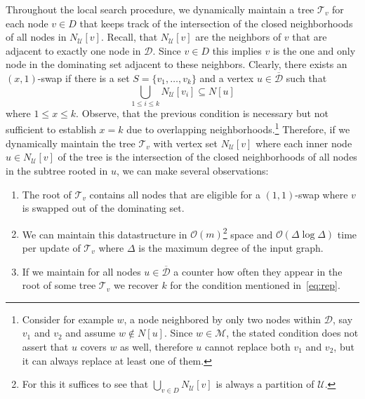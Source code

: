 \documentclass[a4paper, USenglish, cleveref, autoref, thm-restate, noalgorithm2e]{socg-lipics-v2021}
\def\Oh#1{\ensuremath{\mathcal O\!\left(#1\right)}}
\newcommand{\domset}{\ensuremath{\mathcal D}\xspace}
\newcommand{\uniquelycovered}{\ensuremath{\mathcal U}\xspace}
\newcommand{\multicovered}{\ensuremath{\mathcal M}\xspace}
\newcommand{\intersectiontree}{\ensuremath{\mathcal T}\xspace}
\newcommand{\cdomset}{\ensuremath{\overline{\mathcal D}}\xspace}
\begin{document}
Throughout the local search procedure, we dynamically maintain a tree $\intersectiontree_v$ for each node $v \in D$ that keeps track of the intersection of the closed neighborhoods of all nodes in $N_{\uniquelycovered}[v]$.
%
Recall, that $N_{\uniquelycovered}[v]$ are the neighbors of $v$ that are adjacent to exactly one node in $\domset$.
%
Since $v \in D$ this implies $v$ is the one and only node in the dominating set adjacent to these neighbors.
%
Clearly, there exists an $(x,1)$-swap if there is a set $S = \{v_1,\ldots,v_k\}$ and a vertex $u \in \cdomset$ such that
\begin{equation}\label{eq:rep}
    \bigcup_{1\leq i \leq k}N_{\uniquelycovered}[v_i] \subseteq N[u]
\end{equation}
where $1 \leq x\leq k$.
%
Observe, that the previous condition is necessary but not sufficient to establish $x=k$ due to overlapping neighborhoods.\footnote{Consider for example $w$, a node neighbored by only two nodes within $\domset$, say $v_1$ and $v_2$ and assume $w\notin N[u]$. Since $w\in\multicovered$, the stated condition does not assert that $u$ covers $w$ as well, therefore $u$ cannot replace both $v_1$ and $v_2$, but it can always replace at least one of them.}
%
Therefore, if we dynamically maintain the tree $\intersectiontree_v$ with vertex set $N_{\uniquelycovered}[v]$ where each inner node $u \in N_{\uniquelycovered}[v]$ of the tree is the intersection of the closed neighborhoods of all nodes in the subtree rooted in $u$, we can make several observations:
\begin{enumerate}
    \item The root of $\intersectiontree_v$ contains all nodes that are eligible for a $(1,1)$-swap where $v$ is swapped out of the dominating set.
    \item We can maintain this datastructure in $\Oh m$\footnote{For this it suffices to see that $\bigcup_{v\in D} N_{\uniquelycovered}[v]$ is always a partition of $\uniquelycovered$.} space and $\Oh{\Delta\log\Delta}$ time per update of $\intersectiontree_v$ where $\Delta$ is the maximum degree of the input graph.
    \item If we maintain for all nodes $u \in \cdomset$ a counter how often they appear in the root of some tree $\intersectiontree_v$ we recover $k$ for the condition mentioned in~\cref{eq:rep}.
\end{enumerate}
\end{document}
